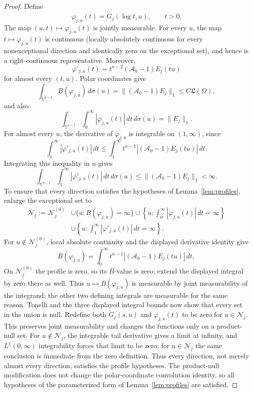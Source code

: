 \documentclass[11pt]{article}
\numberwithin{equation}{section}
\theoremstyle{remark}
\theoremstyle{definition}
\newcommand{\Sph}{\mathbb S}
\newcommand{\norm}[1]{\lVert #1\rVert}
\begin{document}
\begin{proof}
Define
\[
 \varphi_{j,u}(t)=\widetilde G_j(\log t,u),\qquad t>0.
\]
The map $(u,t)\mapsto\varphi_{j,u}(t)$ is jointly measurable.  For every
$u$, the map $t\mapsto\varphi_{j,u}(t)$ is continuous (locally absolutely
continuous for every nonexceptional direction and identically zero on the
exceptional set), and hence is a right-continuous representative.  Moreover,
\[
 \varphi'_{j,u}(t)
 =t^{n-2}(\mathcal A_0-1)E_j(tu)
\]
for almost every $(t,u)$.  Polar coordinates give
\[
 \int_{\Sph^{n-1}}B(\varphi_{j,u})\,d\sigma(u)
 =\norm{(\mathcal A_0-1)E_j}_1
 \le C\mathfrak L(\Omega),
\]
and also
\[
 \int_{\Sph^{n-1}}\int_0^\infty
 |\varphi_{j,u}(t)|\,dt\,d\sigma(u)=\norm{E_j}_1.
\]
For almost every $u$, the derivative of $\varphi_{j,u}$ is integrable on
$(1,\infty)$, since
\[
 \int_1^\infty|\varphi'_{j,u}(t)|\,dt
 \le\int_1^\infty
 t^{n-1}|(\mathcal A_0-1)E_j(tu)|\,dt.
\]
Integrating this inequality in $u$ gives
\[
 \int_{\Sph^{n-1}}\int_1^\infty
 |\varphi'_{j,u}(t)|\,dt\,d\sigma(u)
 \le\norm{(\mathcal A_0-1)E_j}_1<\infty.
\]
To ensure that every direction satisfies the hypotheses of
Lemma~\ref{lem:profiles}, enlarge the exceptional set to
\[
\begin{split}
 \mathcal N_j:=\mathcal N_j^{(0)}
 &\cup\{u:B(\varphi_{j,u})=\infty\}
 \cup\left\{u:\int_0^\infty|\varphi_{j,u}(t)|\,dt=\infty\right\}\\
 &\cup\left\{u:\int_1^\infty|\varphi'_{j,u}(t)|\,dt=\infty\right\}.
\end{split}
\]
For $u\notin\mathcal N_j^{(0)}$, local absolute continuity and the displayed
derivative identity give
\[
 B(\varphi_{j,u})
 =\int_0^\infty t^{n-1}
   |(\mathcal A_0-1)E_j(tu)|\,dt,
\]
On $\mathcal N_j^{(0)}$ the profile is zero, so its $B$-value is zero;
extend the displayed integral by zero there as well.
Thus $u\mapsto B(\varphi_{j,u})$ is measurable by joint measurability of
the integrand; the other two defining integrals are measurable for the
same reason.  Tonelli and the three displayed integral bounds now show
that every set in the union is null.  Redefine both
$\widetilde G_j(s,u)$ and
$\varphi_{j,u}(t)$ to be zero for $u\in\mathcal N_j$.  This preserves joint
measurability and changes the functions only on a product-null set.  For
$u\notin\mathcal N_j$, the integrable tail derivative gives a limit at
infinity,
and $L^1(0,\infty)$ integrability forces that limit to be zero; for
$u\in\mathcal N_j$ the same conclusion is immediate from the zero definition.
Thus every direction, not merely almost every direction, satisfies the
profile hypotheses.  The product-null modification does not change the
polar-coordinate convolution identity, so all hypotheses of the
parameterized form of Lemma~\ref{lem:profiles} are satisfied.


\end{proof}
\end{document}
